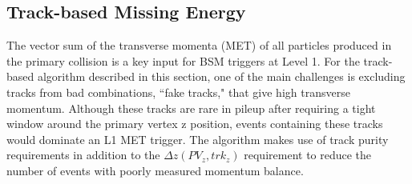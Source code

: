 \subsection{Track-based Missing Energy}
\label{sec:TkMET}

The vector sum of the transverse momenta (MET) of all particles produced in the primary collision is a key input for BSM triggers at Level 1. For the track-based algorithm described in this section, one of the main challenges is excluding tracks from bad combinations, ``fake tracks," that give high transverse momentum. Although these tracks are rare in pileup after requiring a tight window around the primary vertex z position, events containing these tracks would dominate an L1 MET trigger. The algorithm makes use of track purity requirements in addition to the $\Delta z\left(PV_{z}, trk_{z}\right)$ requirement to reduce the number of events with poorly measured momentum balance.


